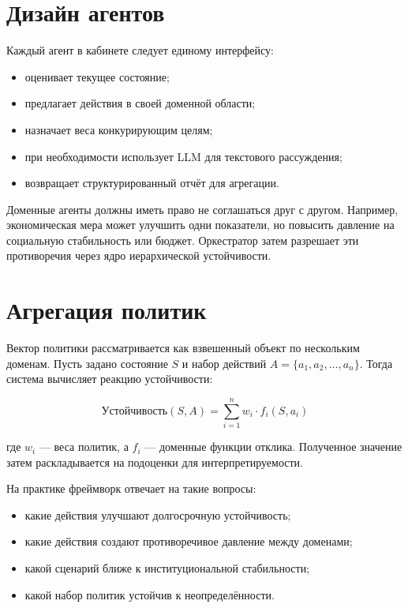 \documentclass[11pt,a4paper]{article}
\begin{document}
\section{Дизайн агентов}

Каждый агент в кабинете следует единому интерфейсу:

\begin{itemize}[leftmargin=1.5em]
    \item оценивает текущее состояние;
    \item предлагает действия в своей доменной области;
    \item назначает веса конкурирующим целям;
    \item при необходимости использует LLM для текстового рассуждения;
    \item возвращает структурированный отчёт для агрегации.
\end{itemize}

Доменные агенты должны иметь право не соглашаться друг с другом. Например, экономическая мера может улучшить одни показатели, но повысить давление на социальную стабильность или бюджет. Оркестратор затем разрешает эти противоречия через ядро иерархической устойчивости.

\section{Агрегация политик}

Вектор политики рассматривается как взвешенный объект по нескольким доменам. Пусть задано состояние $S$ и набор действий $A = \{a_1, a_2, \ldots, a_n\}$. Тогда система вычисляет реакцию устойчивости:

\[
\mathrm{Устойчивость}(S, A) = \sum_{i=1}^{n} w_i \cdot f_i(S, a_i)
\]

где $w_i$ — веса политик, а $f_i$ — доменные функции отклика. Полученное значение затем раскладывается на подоценки для интерпретируемости.

На практике фреймворк отвечает на такие вопросы:

\begin{itemize}[leftmargin=1.5em]
    \item какие действия улучшают долгосрочную устойчивость;
    \item какие действия создают противоречивое давление между доменами;
    \item какой сценарий ближе к институциональной стабильности;
    \item какой набор политик устойчив к неопределённости.
\end{itemize}
\end{document}
